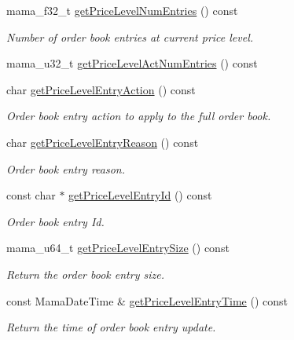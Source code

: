 \begin{CompactItemize}
mama\_\-f32\_\-t \hyperlink{classWombat_1_1MamdaBookAtomicListener_85367024e7790ce720c241849bf38ec2}{get\-Price\-Level\-Num\-Entries} () const 
\begin{CompactList}\small\item\em Number of order book entries at current price level. \item\end{CompactList}\item 
mama\_\-u32\_\-t \hyperlink{classWombat_1_1MamdaBookAtomicListener_0ea6d18818fa9ec05f3e678e0aa58a35}{get\-Price\-Level\-Act\-Num\-Entries} () const 
\item 
char \hyperlink{classWombat_1_1MamdaBookAtomicListener_561b2a785ed0546d0d1d2097b77a4f91}{get\-Price\-Level\-Entry\-Action} () const 
\begin{CompactList}\small\item\em Order book entry action to apply to the full order book. \item\end{CompactList}\item 
char \hyperlink{classWombat_1_1MamdaBookAtomicListener_b7643da89cf38905b17b2bb8a2930f53}{get\-Price\-Level\-Entry\-Reason} () const 
\begin{CompactList}\small\item\em Order book entry reason. \item\end{CompactList}\item 
const char $\ast$ \hyperlink{classWombat_1_1MamdaBookAtomicListener_fde019fedeb06b7edcb5dbad7cb2b598}{get\-Price\-Level\-Entry\-Id} () const 
\begin{CompactList}\small\item\em Order book entry Id. \item\end{CompactList}\item 
mama\_\-u64\_\-t \hyperlink{classWombat_1_1MamdaBookAtomicListener_47bcfe27887db5dab390d398706f96fe}{get\-Price\-Level\-Entry\-Size} () const 
\begin{CompactList}\small\item\em Return the order book entry size. \item\end{CompactList}\item 
const Mama\-Date\-Time \& \hyperlink{classWombat_1_1MamdaBookAtomicListener_fa4686145cc28c1225b9e546399c4ff4}{get\-Price\-Level\-Entry\-Time} () const 
\begin{CompactList}\small\item\em Return the time of order book entry update. \item\end{CompactList}\item 

\end{CompactItemize}

